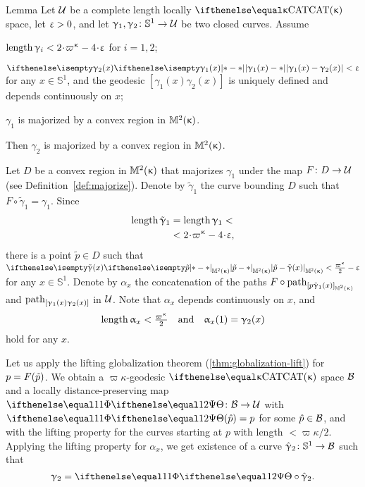 \begin{thm}{Lemma}
Let $\mathcal{U}$ be a complete length locally $\CAT\kappa$ space,
let $\upvarepsilon>0$,
and let $\gamma_1,\gamma_2\:\mathbb{S}^1\to\spc{U}$ be two closed curves.
Assume 
\begin{subthm}{}
$\length\gamma_i<2\cdot\varpi\kappa-4\cdot\eps$ for $i=1,2$;
\end{subthm}
 
\begin{subthm}{} $\dist{\gamma_1(x)}{\gamma_2(x)}{}<\eps$ for any $x\in\mathbb{S}^1$, and the geodesic $[\gamma_1(x)\gamma_2(x)]$ is uniquely defined and depends continuously on $x$;
\end{subthm}

\begin{subthm}{}  $\gamma_1$ is majorized by a convex region in $\mathbb{M}_{{}}^{2}({\upkappa})$.
\end{subthm}

Then  $\gamma_2$ is majorized by a convex region in $\mathbb{M}_{{}}^{2}({\upkappa})$.
\end{thm}

 Let $D$ be a convex region in $\mathbb{M}_{{}}^{2}({\upkappa})$ that majorizes $\gamma_1$ under the map $F\:D\to\spc{U}$ 
(see Definition~\ref{def:majorize}).
Denote by $\tilde \gamma_1$ 
the curve bounding $D$ 
such that $F\circ\tilde \gamma_1=\gamma_1$.
Since  
\begin{align*}
\length\tilde \gamma_1
&=
\length\gamma_1
<
\\
&<
2\cdot\varpi\kappa-4\cdot\eps,
\end{align*}
there is a point $\tilde p\in D$ such that 
$\dist{\tilde p}{\tilde \gamma(x)}{\Lob2\kappa}<\tfrac{\varpi\kappa}2-\eps$
for any $x\in\mathbb{S}^1$.
Denote by $\alpha_x$ the concatenation of the paths $F\circ\geodpath_{[p\tilde \gamma_1(x)]_{\Lob2\kappa}}$ 
and  $\mathrm{path}_{[\upgamma_1(x)\upgamma_2(x)]}$ in $\mathcal{U}$.
Note that $\alpha_x$ depends continuously on $x$, and
$$\length\alpha_x<\tfrac{\varpi\kappa}{2}\quad \text{and}\quad \alpha_x(1)=\gamma_2(x)$$ 
hold for any $x$.

Let us apply the lifting globalization theorem (\ref{thm:globalization-lift}) for $p\z=F(\tilde p)$.
We obtain a $\varpi\kappa$-geodesic $\CAT\kappa$ space $\mathcal{B}$
and a locally distance-preserving map $\map\:\spc{B}\to\spc{U}$
with $\map(\hat p)=p$ for some $\hat p \in \spc{B}$, and with the lifting property for the curves starting at $p$ with length $<\varpi\kappa/2$.
Applying the lifting property for $\alpha_x$, 
we get existence of a curve $\hat\gamma_2\:\mathbb{S}^1\to \spc{B}$ such that
$$\gamma_2=\map\circ\hat\gamma_2.$$

